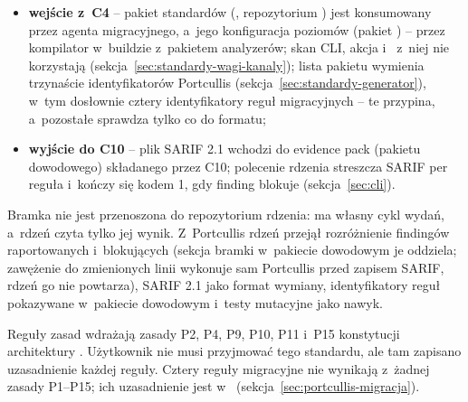 \begin{itemize}[leftmargin=*]
  \item \textbf{wejście z~C4} -- pakiet standardów (, repozytorium
        ) jest konsumowany przez agenta
        migracyjnego, a~jego konfiguracja poziomów (pakiet )
        -- przez kompilator w~buildzie z~pakietem analyzerów; skan CLI, akcja i~
        z~niej nie korzystają (sekcja~\ref{sec:standardy-wagi-kanaly}); lista
         pakietu wymienia
        trzynaście identyfikatorów Portcullis (sekcja~\ref{sec:standardy-generator}), w~tym
        dosłownie cztery identyfikatory reguł migracyjnych  --
        te  przypina, a~pozostałe sprawdza tylko co do formatu;
  \item \textbf{wyjście do C10} -- plik SARIF 2.1 wchodzi do evidence pack (pakietu
        dowodowego) składanego przez C10; polecenie
         rdzenia streszcza SARIF per reguła i~kończy się kodem 1, gdy
        finding blokuje (sekcja~\ref{sec:cli}).
\end{itemize}

Bramka nie jest przenoszona do repozytorium rdzenia: ma własny cykl wydań, a~rdzeń czyta
tylko jej wynik. Z~Portcullis rdzeń przejął rozróżnienie findingów raportowanych i~blokujących (sekcja
bramki w~pakiecie dowodowym je oddziela; zawężenie do zmienionych linii wykonuje sam
Portcullis przed zapisem SARIF, rdzeń go nie powtarza), SARIF 2.1 jako
format wymiany, identyfikatory reguł pokazywane w~pakiecie dowodowym i~testy mutacyjne jako
nawyk.


Reguły zasad wdrażają zasady P2, P4, P9, P10, P11 i~P15 konstytucji architektury
. Użytkownik nie musi przyjmować tego standardu, ale tam
zapisano uzasadnienie każdej reguły. Cztery reguły migracyjne nie wynikają z~żadnej zasady
P1--P15; ich uzasadnienie jest w~
(sekcja~\ref{sec:portcullis-migracja}).



